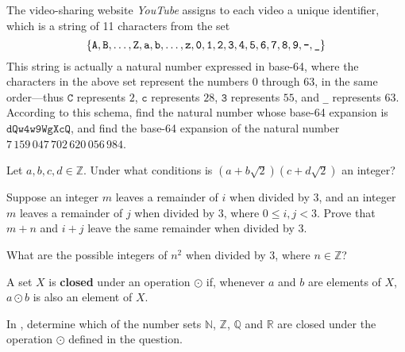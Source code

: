 \begin{chapex}
The video-sharing website \textit{YouTube} assigns to each video a unique identifier, which is a string of 11 characters from the set
\[ \{ \mathtt{A}, \mathtt{B}, \dots, \mathtt{Z}, \mathtt{a}, \mathtt{b}, \dots, \mathtt{z}, \mathtt{0}, \mathtt{1}, \mathtt{2}, \mathtt{3}, \mathtt{4}, \mathtt{5}, \mathtt{6}, \mathtt{7}, \mathtt{8}, \mathtt{9}, \text{\texttt{-}}, \text{\texttt{\_}} \} \]
This string is actually a natural number expressed in base-64, where the characters in the above set represent the numbers $0$ through $63$, in the same order---thus $\mathtt{C}$ represents $2$, $\mathtt{c}$ represents $28$, $\mathtt{3}$ represents $55$, and \texttt{\_} represents $63$. According to this schema, find the natural number whose base-64 expansion is $\mathtt{dQw4w9WgXcQ}$, and find the base-64 expansion of the natural number $7\,159\,047\,702\,620\,056\,984$.
\end{chapex}

\begin{chapex}
Let $a, b, c, d \in \mathbb{Z}$. Under what conditions is $(a+b\sqrt{2})(c+d\sqrt{2})$ an integer?
\end{chapex}

\begin{chapex}
Suppose an integer $m$ leaves a remainder of $i$ when divided by $3$, and an integer $m$ leaves a remainder of $j$ when divided by $3$, where $0 \le i,j < 3$. Prove that $m+n$ and $i+j$ leave the same remainder when divided by $3$.
\end{chapex}

\begin{chapex}
What are the possible integers of $n^2$ when divided by $3$, where $n \in \mathbb{Z}$?
\end{chapex}

\begin{definition}
A set $X$ is \textbf{closed} under an operation $\odot$ if, whenever $a$ and $b$ are elements of $X$, $a \odot b$ is also an element of $X$.
\end{definition}

In , determine which of the number sets $\mathbb{N}$, $\mathbb{Z}$, $\mathbb{Q}$ and $\mathbb{R}$ are closed under the operation $\odot$ defined in the question.

